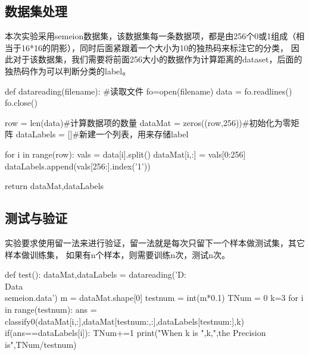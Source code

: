 \documentclass[UTF8,a4paper,10pt]{ctexart}
\begin{document}
\subsection{数据集处理}

本次实验采用semeion数据集，该数据集每一条数据项，都是由256个0或1组成（相当于16*16的阴影），同时后面紧跟着一个大小为10的独热码来标注它的分类，
因此对于该数据集，我们需要将前面256大小的数据作为计算距离的dataset，后面的独热码作为可以判断分类的label。

\begin{python}
   def datareading(filename):
    #读取文件
    fo=open(filename)
    data = fo.readlines()
    fo.close()

    row = len(data)#计算数据项的数量
    dataMat = zeros((row,256))#初始化为零矩阵
    dataLabels = []#新建一个列表，用来存储label

    for i in range(row):
        vals = data[i].split()
        dataMat[i,:] = vals[0:256]
        dataLabels.append(vals[256:].index('1'))

    return dataMat,dataLabels
\end{python}

\subsection{测试与验证}
实验要求使用留一法来进行验证，留一法就是每次只留下一个样本做测试集，其它样本做训练集，
如果有n个样本，则需要训练n次，测试n次。
\begin{python}
   def test():
    dataMat,dataLabels = datareading('D:\\Data\\semeion.data')
    m = dataMat.shape[0]
    testnum = int(m*0.1)
    TNum = 0
    k=3
    for i in range(testnum):
        ans = classify0(dataMat[i,:],dataMat[testnum:,:],dataLabels[testnum:],k)
        if(ans==dataLabels[i]): TNum+=1
    print("When k is ",k,",the Precision is",TNum/testnum)
\end{python}

\end{document}
